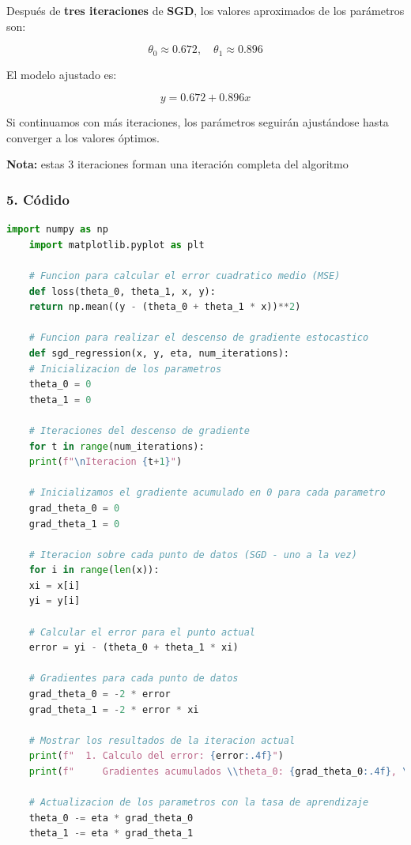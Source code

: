 \documentclass{article}
\begin{document}
Después de \textbf{tres iteraciones} de \textbf{SGD}, los valores aproximados de los parámetros son:

\[
\theta_0 \approx 0.672, \quad \theta_1 \approx 0.896
\]

El modelo ajustado es:

\[
y = 0.672 + 0.896x
\]

Si continuamos con más iteraciones, los parámetros seguirán ajustándose hasta converger a los valores óptimos.

\textbf{Nota:} estas 3 iteraciones forman una iteración completa del algoritmo

\subsubsection*{5. Códido}
\begin{lstlisting}[language=Python, caption=Regresión Lineal con SGD, frame=single]
	import numpy as np
	import matplotlib.pyplot as plt
	
	# Funcion para calcular el error cuadratico medio (MSE)
	def loss(theta_0, theta_1, x, y):
	return np.mean((y - (theta_0 + theta_1 * x))**2)
	
	# Funcion para realizar el descenso de gradiente estocastico
	def sgd_regression(x, y, eta, num_iterations):
	# Inicializacion de los parametros
	theta_0 = 0
	theta_1 = 0
	
	# Iteraciones del descenso de gradiente
	for t in range(num_iterations):
	print(f"\nIteracion {t+1}")
	
	# Inicializamos el gradiente acumulado en 0 para cada parametro
	grad_theta_0 = 0
	grad_theta_1 = 0
	
	# Iteracion sobre cada punto de datos (SGD - uno a la vez)
	for i in range(len(x)):
	xi = x[i]
	yi = y[i]
	
	# Calcular el error para el punto actual
	error = yi - (theta_0 + theta_1 * xi)
	
	# Gradientes para cada punto de datos
	grad_theta_0 = -2 * error
	grad_theta_1 = -2 * error * xi
	
	# Mostrar los resultados de la iteracion actual
	print(f"  1. Calculo del error: {error:.4f}")
	print(f"     Gradientes acumulados \\theta_0: {grad_theta_0:.4f}, \\theta_1: {grad_theta_1:.4f}")
	
	# Actualizacion de los parametros con la tasa de aprendizaje
	theta_0 -= eta * grad_theta_0
	theta_1 -= eta * grad_theta_1
	

\end{lstlisting}
\end{document}
